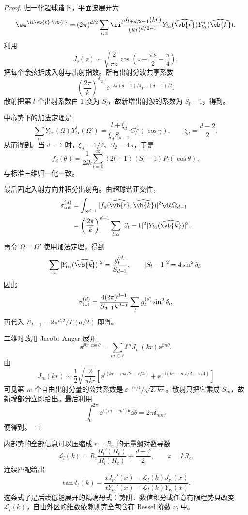 \begin{proof}
归一化超球谐下，平面波展开为
\begin{equation}
\ee^{\ii\vb{k}\cdot\vb{r}}
=(2\pi)^{d/2}
\sum_{l,\alpha}\ii^l
\frac{J_{l+d/2-1}(kr)}{(kr)^{d/2-1}}
Y_{l\alpha}(\widehat{\vb{r}})Y_{l\alpha}^*(\widehat{\vb{k}}).
\label{eq:phys-hdqm-plane-wave-d}
\end{equation}
利用
\[
J_\nu(z)\sim\sqrt{\frac{2}{\pi z}}
\cos\!\left(z-\frac{\pi\nu}{2}-\frac\pi4\right),
\]
把每个余弦拆成入射与出射指数。所有出射分波共享系数
\[
\left(\frac{2\pi}{k}\right)^{\frac{d-1}{2}}
\ee^{-\ii\pi(d-1)/4}r^{-(d-1)/2}.
\]
散射把第 $l$ 个出射系数由 $1$ 变为 $S_l$，故新增出射波的系数为 $S_l-1$，得到。

中心势下的加法定理是
\[
\sum_\alpha Y_{l\alpha}(\Omega)Y_{l\alpha}^*(\Omega')
=\frac{l+\xi_d}{\xi_d S_{d-1}}C_l^{\xi_d}(\cos\gamma),
\qquad \xi_d=\frac{d-2}{2},
\]
从而得到。当 $d=3$ 时，$\xi_d=1/2$、$S_2=4\pi$，于是
\[
f_3(\theta)=\frac1{2\ii k}
\sum_{l=0}^{\infty}(2l+1)(S_l-1)P_l(\cos\theta),
\]
与标准三维归一化一致。

最后固定入射方向并积分出射角。由超球谐正交性，
\[
\begin{aligned}
\sigma_{\rm tot}^{(d)}
&=\int_{S^{d-1}}|f_d(\widehat{\vb{r}},\widehat{\vb{k}})|^2\dd\Omega_{d-1}\\
&=\left(\frac{2\pi}{k}\right)^{d-1}
\sum_{l,\alpha}|S_l-1|^2|Y_{l\alpha}(\widehat{\vb{k}})|^2.
\end{aligned}
\]
再令 $\Omega=\Omega'$ 使用加法定理，得到
\[
\sum_\alpha|Y_{l\alpha}(\widehat{\vb{k}})|^2=\frac{g_l^{(d)}}{S_{d-1}},
\qquad
|S_l-1|^2=4\sin^2\delta_l.
\]
因此
\[
\sigma_{\rm tot}^{(d)}
=\frac{4(2\pi)^{d-1}}{S_{d-1}k^{d-1}}
\sum_l g_l^{(d)}\sin^2\delta_l,
\]
再代入 $S_{d-1}=2\pi^{d/2}/\Gamma(d/2)$ 即得。

二维时改用 Jacobi--Anger 展开
\[
\ee^{\ii kr\cos\theta}
=\sum_{m\in\mathbb Z}\ii^mJ_m(kr)\ee^{\ii m\theta}.
\]
由
\[
J_m(kr)\sim\frac12\sqrt{\frac{2}{\pi kr}}
\left[
\ee^{\ii(kr-m\pi/2-\pi/4)}
+\ee^{-\ii(kr-m\pi/2-\pi/4)}
\right]
\]
可见第 $m$ 个自由出射分量的公共系数是
$\ee^{-\ii\pi/4}/\sqrt{2\pi k r}$。散射只把它乘成 $S_m$，故新增部分立即给出。最后利用
\[
\int_0^{2\pi}\ee^{\ii(m-m')\theta}\dd\theta
=2\pi\delta_{mm'}
\]
便得到。
\end{proof}

内部势的全部信息可以压缩成 $r=R_c$ 的无量纲对数导数
\[
\mathcal L_l(k)=R_c\frac{R_l'(R_c)}{R_l(R_c)}+\frac{d-2}{2},
\qquad x=kR_c.
\]
连续匹配给出
\begin{equation}
\tan\delta_l(k)=
\frac{xJ_{\nu_l}'(x)-\mathcal L_l(k)J_{\nu_l}(x)}
{xY_{\nu_l}'(x)-\mathcal L_l(k)Y_{\nu_l}(x)}.
\label{eq:phys-hdqm-phase-log-derivative}
\end{equation}
这条式子是后续低能展开的精确母式：势阱、数值积分或任意有限程势只改变 $\mathcal L_l(k)$，自由外区的维数依赖则完全包含在 Bessel 阶数 $\nu_l$ 中。

